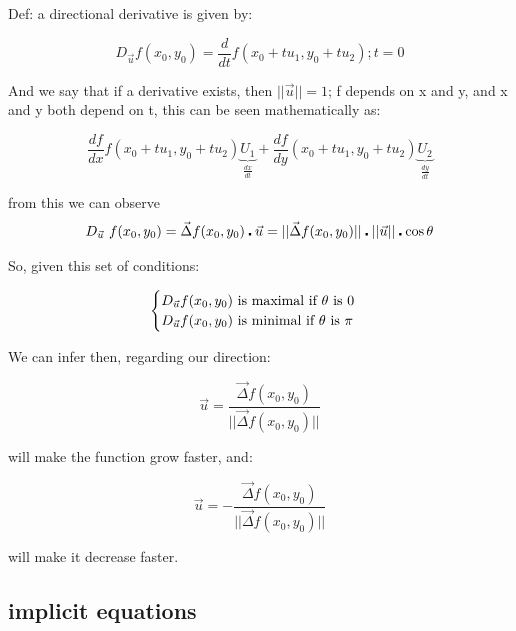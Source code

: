 \documentclass[11pt,fleqn]{book} %
\begin{document}
Def: a directional derivative is given by:

\begin{equation}
    D_{\vec{u}}f(x_0,y_0) = \frac{d}{dt} f(x_0 + t u_1, y_0 + t u_2) ; t = 0
\end{equation}

And we say that if a derivative exists, then $||\vec{u}|| = 1$;
f depends on x and y, and x and y both depend on t, this can be seen mathematically as:

\begin{equation}
    \frac{df}{dx} f(x_0 + t u_1, y_0 + t u_2) \underbrace{U_1}_{\frac{dx}{dt}} + \frac{df}{dy}(x_0 + t u_1, y_0 + t u_2) \underbrace{U_2}_{\frac{dy}{dt}}
\end{equation}

from this we can observe
\begin{equation}
    D_{\vec{u}}\ f(x_0, y_0) = \vec{\Delta} f(x_0, y_0) \centerdot \vec{u} = ||\vec{\Delta} f(x_0,y_0)|| \centerdot ||\vec{u}|| \centerdot \cos \theta\\
\end{equation}

So, given this set of conditions:

\begin{gather}
    \begin{cases}
        D_{\vec{u}} f(x_0, y_0) \text{  is maximal if $ \theta $ is 0} \\
        D_{\vec{u}} f(x_0, y_0) \text{  is minimal if $ \theta $ is $\pi$}
    \end{cases}
\end{gather}

We can infer then, regarding our direction:

\begin{equation}
    \vec{u} = \frac{\vec{\Delta} f(x_0, y_0)}{||\vec{\Delta}f(x_0,y_0)||}
\end{equation}

will make the function grow faster, and:

\begin{equation}
    \vec{u} = - \frac{\vec{\Delta} f(x_0, y_0)}{||\vec{\Delta}f(x_0,y_0)||}
\end{equation}

will make it decrease faster.
 

\subsection{implicit equations}
\end{document}
